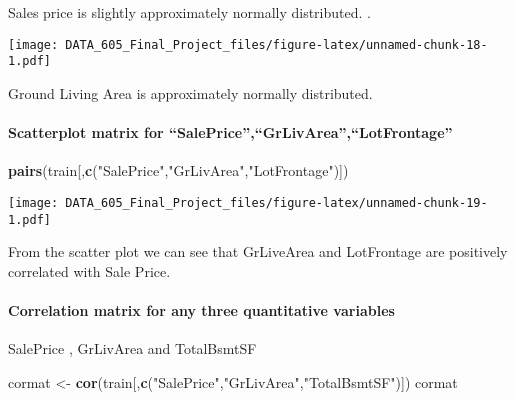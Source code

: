 \documentclass[]{article}
\newenvironment{Shaded}{\begin{snugshade}}{\end{snugshade}}
\newcommand{\DataTypeTok}[1]{\textcolor[rgb]{0.13,0.29,0.53}{#1}}
\newcommand{\KeywordTok}[1]{\textcolor[rgb]{0.13,0.29,0.53}{\textbf{#1}}}
\newcommand{\NormalTok}[1]{#1}
\newcommand{\OperatorTok}[1]{\textcolor[rgb]{0.81,0.36,0.00}{\textbf{#1}}}
\newcommand{\StringTok}[1]{\textcolor[rgb]{0.31,0.60,0.02}{#1}}
\let\oldparagraph\paragraph
\renewcommand{\paragraph}[1]{\oldparagraph{#1}\mbox{}}
\begin{document}
Sales price is slightly approximately normally distributed. .

\begin{Shaded}
\end{Shaded}

\texttt{[image: DATA\_605\_Final\_Project\_files/figure-latex/unnamed-chunk-18-1.pdf]}

Ground Living Area is approximately normally distributed.

\hypertarget{scatterplot-matrix-for-salepricegrlivarealotfrontage}{%
\paragraph{Scatterplot matrix for
``SalePrice'',``GrLivArea'',``LotFrontage''}\label{scatterplot-matrix-for-salepricegrlivarealotfrontage}}

\begin{Shaded}
\begin{Highlighting}[]
\KeywordTok{pairs}\NormalTok{(train[,}\KeywordTok{c}\NormalTok{(}\StringTok{"SalePrice"}\NormalTok{,}\StringTok{"GrLivArea"}\NormalTok{,}\StringTok{"LotFrontage"}\NormalTok{)])}
\end{Highlighting}
\end{Shaded}

\texttt{[image: DATA\_605\_Final\_Project\_files/figure-latex/unnamed-chunk-19-1.pdf]}

From the scatter plot we can see that GrLiveArea and LotFrontage are
positively correlated with Sale Price.

\hypertarget{correlation-matrix-for-any-three-quantitative-variables}{%
\paragraph{Correlation matrix for any three quantitative
variables}\label{correlation-matrix-for-any-three-quantitative-variables}}

SalePrice , GrLivArea and TotalBsmtSF

\begin{Shaded}
\begin{Highlighting}[]
\NormalTok{cormat <-}\StringTok{ }\KeywordTok{cor}\NormalTok{(train[,}\KeywordTok{c}\NormalTok{(}\StringTok{"SalePrice"}\NormalTok{,}\StringTok{"GrLivArea"}\NormalTok{,}\StringTok{"TotalBsmtSF"}\NormalTok{)])}
\NormalTok{cormat}
\end{Highlighting}
\end{Shaded}
\end{document}
